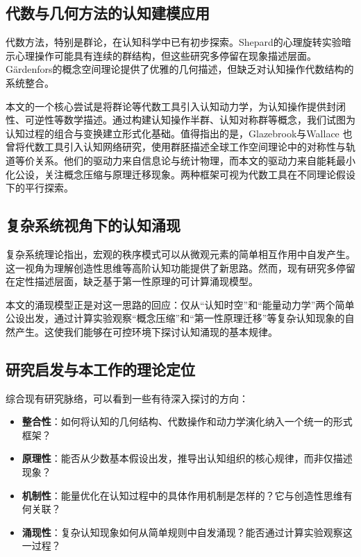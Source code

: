 \documentclass[12pt,a4paper]{article}
\begin{document}
\subsection{代数与几何方法的认知建模应用}

代数方法，特别是群论\cite{rotman1995theory}，在认知科学中已有初步探索。Shepard的心理旋转实验暗示心理操作可能具有连续的群结构，但这些研究多停留在现象描述层面。Gärdenfors的概念空间理论提供了优雅的几何描述，但缺乏对认知操作代数结构的系统整合。

本文的一个核心尝试是将群论等代数工具引入认知动力学，为认知操作提供封闭性、可逆性等数学描述。通过构建认知操作半群、认知对称群等概念，我们试图为认知过程的组合与变换建立形式化基础。值得指出的是，Glazebrook与Wallace \cite{glazebrook2009small} 也曾将代数工具引入认知网络研究，使用群胚描述全球工作空间理论中的对称性与轨道等价关系。他们的驱动力来自信息论与统计物理，而本文的驱动力来自能耗最小化公设，关注概念压缩与原理迁移现象。两种框架可视为代数工具在不同理论假设下的平行探索。

\subsection{复杂系统视角下的认知涌现}

复杂系统理论指出，宏观的秩序模式可以从微观元素的简单相互作用中自发产生。这一视角为理解创造性思维等高阶认知功能提供了新思路。然而，现有研究多停留在定性描述层面，缺乏基于第一性原理的可计算涌现模型。

本文的涌现模型正是对这一思路的回应：仅从“认知时空”和“能量动力学”两个简单公设出发，通过计算实验观察“概念压缩”和“第一性原理迁移”等复杂认知现象的自然产生。这使我们能够在可控环境下探讨认知涌现的基本规律。

\subsection{研究启发与本工作的理论定位}
\label{subsec:research_gaps_positioning}

综合现有研究脉络，可以看到一些有待深入探讨的方向：

\begin{itemize}
\item \textbf{整合性}：如何将认知的几何结构、代数操作和动力学演化纳入一个统一的形式框架？
\item \textbf{原理性}：能否从少数基本假设出发，推导出认知组织的核心规律，而非仅描述现象？
\item \textbf{机制性}：能量优化在认知过程中的具体作用机制是怎样的？它与创造性思维有何关联？
\item \textbf{涌现性}：复杂认知现象如何从简单规则中自发涌现？能否通过计算实验观察这一过程？
\end{itemize}
\end{document}
